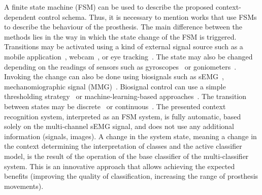 A finite state machine (FSM) can be used to describe the proposed context-dependent control schema. Thus, it is necessary to mention works that use FSMs to describe the behaviour of the prosthesis. The main difference between the methods lies in the way in which the state change of the FSM is triggered. Transitions may be activated using a kind of external signal source such as a mobile application~\cite{Fajardo2021}, webcam~\cite{Fajardo2018}, or eye tracking~\cite{Shi2023}. The state may also be changed depending on the readings of sensors such as gyroscopes~\cite{Patel2017} or goniometers~\cite{Batzianoulis2019}. Invoking the change can also be done using biosignals such as sEMG~\cite{Nacpil2019}, mechanomiographic signal (MMG)~\cite{Geng2012}. Biosignal control can use a simple thresholding strategy~\cite{Nacpil2019} or machine-learning-based approaches~\cite{Cardona2020}. The transition between states may be discrete~\cite{DAccolti2023} or continuous~\cite{Piazza2020}. The presented context recognition system, interpreted as an FSM system, is fully automatic, based solely on the multi-channel sEMG signal, and does not use any additional information (signals, images). A change in the system state, meaning a change in the context determining the interpretation of classes and the active classifier model, is the result of the operation of the base classifier of the multi-classifier system. This is an innovative approach that allows achieving the expected benefits (improving the quality of classification, increasing the range of prosthesis movements).